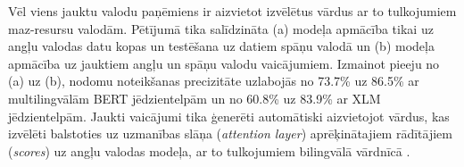 Vēl viens jauktu valodu paņēmiens ir aizvietot izvēlētus vārdus ar to tulkojumiem maz-resursu valodām. Pētījumā \cite{liu2020} tika salīdzināta (a) modeļa apmācība tikai uz angļu valodas datu kopas un testēšana uz datiem spāņu valodā un (b) modeļa apmācība uz jauktiem angļu un spāņu valodu vaicājumiem. Izmainot pieeju no (a) uz (b), nodomu noteikšanas precizitāte uzlabojās no 73.7\% uz 86.5\% ar multilingvālām BERT jēdzientelpām un no 60.8\% uz 83.9\% ar XLM jēdzientelpām. Jaukti vaicājumi tika ģenerēti automātiski aizvietojot vārdus, kas izvēlēti balstoties uz uzmanības slāņa (\textit{attention layer}) aprēķinātajiem rādītājiem (\textit{scores}) uz angļu valodas modeļa, ar to tulkojumiem bilingvālā vārdnīcā \cite{liu2020}.
